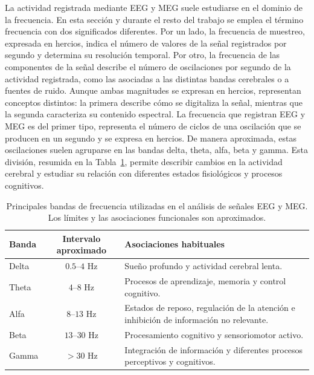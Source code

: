 La actividad registrada mediante EEG y MEG suele estudiarse en el dominio de la frecuencia. En esta sección y durante el resto del trabajo se emplea el término frecuencia con dos significados diferentes. Por un lado, la frecuencia de muestreo, expresada en hercios, indica el número de valores de la señal registrados por segundo y determina su resolución temporal. Por otro, la frecuencia de las componentes de la señal describe el número de oscilaciones por segundo de la actividad registrada, como las asociadas a las distintas bandas cerebrales o a fuentes de ruido. Aunque ambas magnitudes se expresan en hercios, representan conceptos distintos: la primera describe cómo se digitaliza la señal, mientras que la segunda caracteriza su contenido espectral. La frecuencia que registran EEG y MEG es del primer tipo, representa el número de ciclos de una oscilación que se producen en un segundo y se expresa en hercios. De manera aproximada, estas oscilaciones suelen agruparse en las bandas delta, theta, alfa, beta y gamma. Esta división, resumida en la Tabla~\ref{tab:frequency_bands}, permite describir cambios en la actividad cerebral y estudiar su relación con diferentes estados fisiológicos y procesos cognitivos.

\begin{table}[htbp]
\centering
\small
\caption{Principales bandas de frecuencia utilizadas en el análisis de señales EEG y MEG. Los límites y las asociaciones funcionales son aproximados.}
\label{tab:frequency_bands}
\begin{tabularx}{\textwidth}{l c X}
\toprule
\textbf{Banda} & \textbf{Intervalo aproximado} & \textbf{Asociaciones habituales} \\
\midrule
Delta & $0{.}5$--$4$ Hz &
Sueño profundo y actividad cerebral lenta. \\

    Theta & $4$--$8$ Hz &
    Procesos de aprendizaje, memoria y control cognitivo. \\

    Alfa & $8$--$13$ Hz &
    Estados de reposo, regulación de la atención e inhibición de información no relevante. \\

    Beta & $13$--$30$ Hz &
    Procesamiento cognitivo y sensoriomotor activo. \\

    Gamma & $>30$ Hz &
    Integración de información y diferentes procesos perceptivos y cognitivos. \\
    \bottomrule
\end{tabularx}

\end{table}

